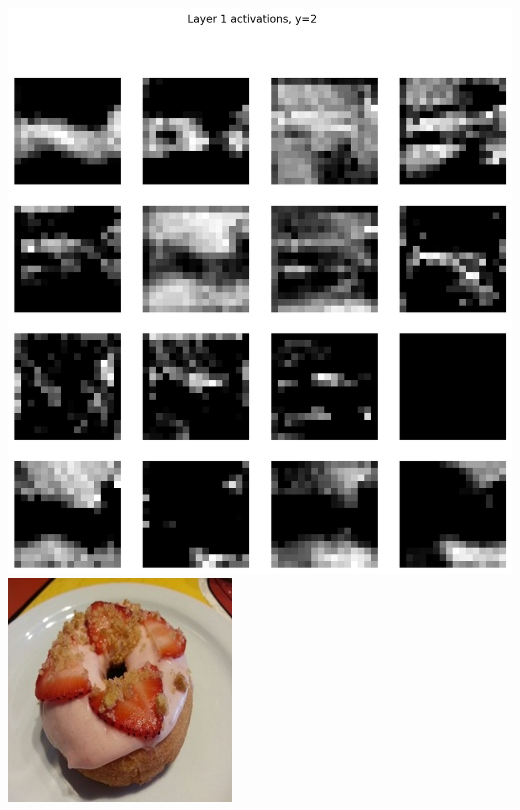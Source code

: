 \documentclass[11pt, answers]{exam}
\begin{document}
\begin{solution}
\begin{parts}
\begin{center}
      \includegraphics[scale=0.6]{CNN_viz1_2.png}
      \includegraphics[scale=0.3]{00014.jpg}

\end{center}
\end{parts}
\end{solution}
\end{document}
